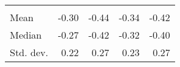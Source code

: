 \begin{tabular}{lllll}
  \multicolumn{1}{|r}{} &
  \multicolumn{1}{r}{} &
  \multicolumn{1}{r}{} &
  \multicolumn{1}{r}{} \\
\multicolumn{1}{l}{\hspace{2em}Mean} &
  \multicolumn{1}{|r}{-0.30} &
  \multicolumn{1}{r}{-0.44} &
  \multicolumn{1}{r}{-0.34} &
  \multicolumn{1}{r}{-0.42} \\
\multicolumn{1}{l}{\hspace{2em}Median} &
  \multicolumn{1}{|r}{-0.27} &
  \multicolumn{1}{r}{-0.42} &
  \multicolumn{1}{r}{-0.32} &
  \multicolumn{1}{r}{-0.40} \\
\multicolumn{1}{l}{\hspace{2em}Std. dev.} &
  \multicolumn{1}{|r}{0.22} &
  \multicolumn{1}{r}{0.27} &
  \multicolumn{1}{r}{0.23} &
  \multicolumn{1}{r}{0.27} \\
\cline{1-5}
\end{tabular}
